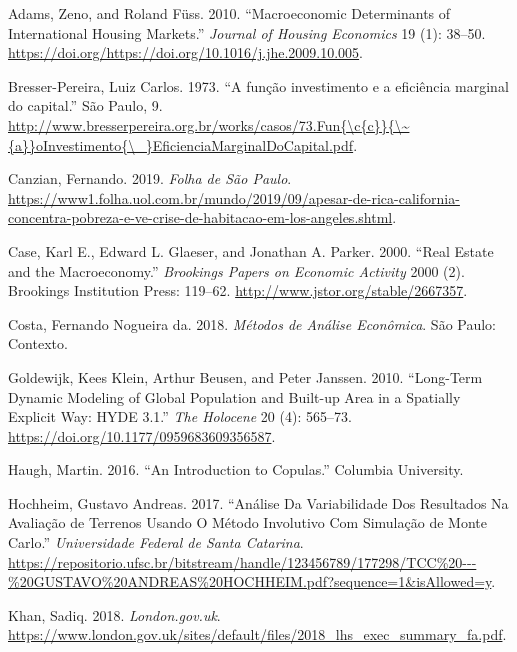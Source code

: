 \documentclass[
	12pt,				%
	oneside,			%
	a4paper,			%
	chapter=TITLE,		%
	section=TITLE,		%
	english,			%
	brazil				%
	]{abntex2}
\begin{document}
\leavevmode\hypertarget{ref-ADAMS201038}{}%
Adams, Zeno, and Roland Füss. 2010. ``Macroeconomic Determinants of International Housing Markets.'' \emph{Journal of Housing Economics} 19 (1): 38--50. \url{https://doi.org/https://doi.org/10.1016/j.jhe.2009.10.005}.

\leavevmode\hypertarget{ref-Bresser-Pereira1973}{}%
Bresser-Pereira, Luiz Carlos. 1973. ``A função investimento e a eficiência marginal do capital.'' São Paulo, 9. \href{http://www.bresserpereira.org.br/works/casos/73.Fun\%7B/c\%7Bc\%7D\%7D\%7B/~\%7Ba\%7D\%7DoInvestimento\%7B/_\%7DEficienciaMarginalDoCapital.pdf}{http://www.bresserpereira.org.br/works/casos/73.Fun\{\textbackslash{}c\{c\}\}\{\textbackslash{}\textasciitilde{}\{a\}\}oInvestimento\{\textbackslash{}\_\}EficienciaMarginalDoCapital.pdf}.

\leavevmode\hypertarget{ref-california}{}%
Canzian, Fernando. 2019. \emph{Folha de São Paulo}. \url{https://www1.folha.uol.com.br/mundo/2019/09/apesar-de-rica-california-concentra-pobreza-e-ve-crise-de-habitacao-em-los-angeles.shtml}.

\leavevmode\hypertarget{ref-Case2000}{}%
Case, Karl E., Edward L. Glaeser, and Jonathan A. Parker. 2000. ``Real Estate and the Macroeconomy.'' \emph{Brookings Papers on Economic Activity} 2000 (2). Brookings Institution Press: 119--62. \url{http://www.jstor.org/stable/2667357}.

\leavevmode\hypertarget{ref-fnogueira}{}%
Costa, Fernando Nogueira da. 2018. \emph{Métodos de Análise Econômica}. São Paulo: Contexto.

\leavevmode\hypertarget{ref-doi:10.1177ux2f0959683609356587}{}%
Goldewijk, Kees Klein, Arthur Beusen, and Peter Janssen. 2010. ``Long-Term Dynamic Modeling of Global Population and Built-up Area in a Spatially Explicit Way: HYDE 3.1.'' \emph{The Holocene} 20 (4): 565--73. \url{https://doi.org/10.1177/0959683609356587}.

\leavevmode\hypertarget{ref-copulas}{}%
Haugh, Martin. 2016. ``An Introduction to Copulas.'' Columbia University.

\leavevmode\hypertarget{ref-gahochheim}{}%
Hochheim, Gustavo Andreas. 2017. ``Análise Da Variabilidade Dos Resultados Na Avaliação de Terrenos Usando O Método Involutivo Com Simulação de Monte Carlo.'' \emph{Universidade Federal de Santa Catarina}. \url{https://repositorio.ufsc.br/bitstream/handle/123456789/177298/TCC\%20---\%20GUSTAVO\%20ANDREAS\%20HOCHHEIM.pdf?sequence=1\&isAllowed=y}.

\leavevmode\hypertarget{ref-londres}{}%
Khan, Sadiq. 2018. \emph{London.gov.uk}. \url{https://www.london.gov.uk/sites/default/files/2018_lhs_exec_summary_fa.pdf}.
\end{document}
